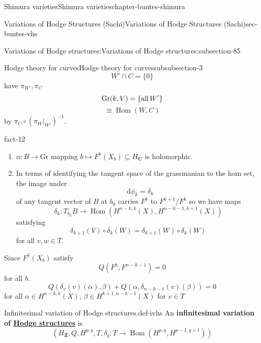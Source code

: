 \documentclass[oneside,10pt,]{book}
\newcommand{\terminology}[1]{\textbf{#1}}
\numberwithin{equation}{section}
\newcommand{\diff}{\mathop{}\!\mathrm{d}}
\newcommand{\inv}{^{-1}}
\newcommand{\ZZ}{\mathbf{Z}}
\newcommand{\CC}{\mathbf{C}}
\DeclareMathOperator{\Hom}{Hom}
\begin{document}
\begin{chapterptx}{Shimura varieties}{}{Shimura varieties}{}{}{chapter-buntes-shimura}
\begin{sectionptx}{Variations of Hodge Structures (Sachi)}{}{Variations of Hodge Structures (Sachi)}{}{}{sec-buntes-vhs}
\begin{subsectionptx}{Variations of Hodge structures:}{}{Variations of Hodge structures:}{}{}{subsection-85}
\begin{subsubsectionptx}{Hodge theory for curves}{}{Hodge theory for curves}{}{}{subsubsection-3}
\begin{equation*}
W' \cap C =  \{ 0 \}
\end{equation*}
have \(\pi_{W'}, \pi_C\)%
\begin{equation*}
{\mathrm{Gr}}(k,V) = \{\text{all\,}W'\}
\end{equation*}
%
\begin{equation*}
\cong \Hom(W,C)
\end{equation*}
by \(\pi_C \circ (\pi_W|_{W'})\inv\).%
\begin{fact}{}{}{fact-12}%
\hypertarget{p-1165}{}%
\leavevmode%
\begin{enumerate}
\item\hypertarget{li-290}{}\(\phi\colon B\to {\mathrm{Gr}}\) mapping \(b \mapsto F^k(X_b) \subseteq H_\CC\) is holomorphic.%
\item\hypertarget{li-291}{}In terms of identifying the tangent space of the grassmanian to the hom set, the image under%
\begin{equation*}
\diff \phi_k = \delta_k
\end{equation*}
of any tangent vector of \(B\) at \(b_0\) carries \(F^{k} \) to \(F^{k+1}/F^k\) so we have maps%
\begin{equation*}
\delta_k \colon T_{b_0} B \to \Hom(H^{n-k,k} (X), H^{n-k-1, k+1}(X))
\end{equation*}
satisfying%
\begin{equation*}
\delta_{k+1} (V) \circ \delta_k(W) =  \delta_{k+1}(W) \circ \delta_k(W)
\end{equation*}
for all \(v,w\in T\).%
\end{enumerate}
%
\end{fact}
\hypertarget{p-1166}{}%
Since \(F^k(X_b)\) satisfy%
\begin{equation*}
Q(F^k, F^{n- k - 1} ) = 0
\end{equation*}
for all \(b\).%
\begin{equation*}
Q(\delta_v(v)(\alpha), \beta) + Q(\alpha, \delta_{n-k-1}(v)(\beta)) = 0
\end{equation*}
for all \(\alpha\in H^{n-k, k}(X)\), \(\beta \in H^{k+1, n-k - 1}(X)\) for \(v \in T\)%
\begin{definition}{Infinitesimal variation of Hodge structures.}{def-ivhs}%
\hypertarget{p-1167}{}%
An \terminology{infinitesimal variation of \hyperref[def-hodge-str]{Hodge structures}} is%
\begin{equation*}
(H_\ZZ, Q, H^{p,q}, T, \delta_q\colon T \to \Hom(H^{p,q}, H^{p-1, q+1}))
\end{equation*}

\end{definition}
\end{subsubsectionptx}
\end{subsectionptx}
\end{sectionptx}
\end{chapterptx}
\end{document}
